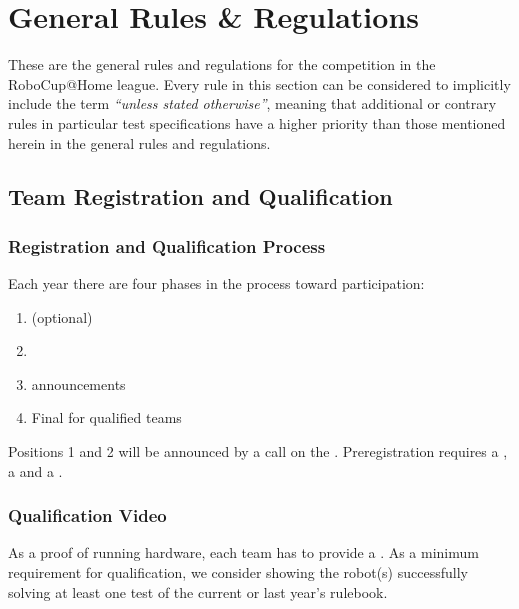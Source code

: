 \chapter{General Rules \& Regulations}
\label{chap:rules}

These are the general rules and regulations for the competition in the RoboCup@Home league.
Every rule in this section can be considered to implicitly include the 
term \emph{``unless stated otherwise''}, meaning that additional or contrary rules in particular
test specifications have a higher priority than those mentioned herein in the general rules and regulations.  


\section{Team Registration and Qualification}


\subsection{Registration and Qualification Process}\label{rule:participation}

Each year there are four phases in the process toward participation:
\begin{enumerate}
\item {} (optional)
\item {} 
\item {} announcements
\item Final  for qualified teams
\end{enumerate}
Positions 1 and 2 will be announced by a call on the .
Preregistration requires a , a  and a .

\subsection{Qualification Video}
As a proof of running hardware, each team has to provide a . 
As a minimum requirement for qualification, we consider showing the robot(s) successfully 
solving at least one test of the current or last year's rulebook.


